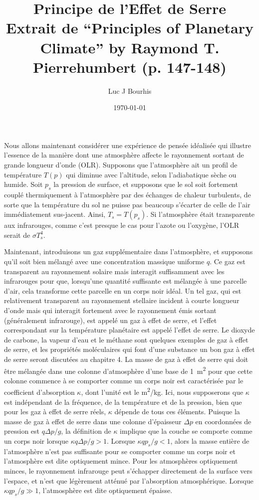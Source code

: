 \documentclass[11pt, a4paper]{article}
\title{\textbf{Principe de l'Effet de Serre\\
Extrait de ``Principles of Planetary Climate'' by Raymond T. Pierrehumbert (p. 147-148)}}
\author{Luc J Bourhis}
\date{\today}                   %
\begin{document}
\maketitle

Nous allons maintenant considérer une expérience de pensée idéalisée qui illustre l'essence de la manière dont une atmosphère affecte le rayonnement sortant de grande longueur d'onde (OLR). Supposons que l'atmosphère ait un profil de température $T(p)$ qui diminue avec l'altitude, selon l'adiabatique sèche ou humide. Soit $p_s$ la pression de surface, et supposons que le sol soit fortement couplé thermiquement à l'atmosphère par des échanges de chaleur turbulents, de sorte que la température du sol ne puisse pas beaucoup s'écarter de celle de l'air immédiatement sus-jacent. Ainsi, $T_s = T(p_s)$. Si l'atmosphère était transparente aux infrarouges, comme c'est presque le cas pour l'azote ou l'oxygène, l'OLR serait de $\sigma T_s^4$.

Maintenant, introduisons un gaz supplémentaire dans l'atmosphère, et supposons qu'il soit bien mélangé avec une concentration massique uniforme $q$. Ce gaz est transparent au rayonnement solaire mais interagit suffisamment avec les infrarouges pour que, lorsqu'une quantité suffisante est mélangée à une parcelle d'air, cela transforme cette parcelle en un corps noir idéal. Un tel gaz, qui est relativement transparent au rayonnement stellaire incident à courte longueur d'onde mais qui interagit fortement avec le rayonnement émis sortant (généralement infrarouge), est appelé un gaz à effet de serre, et l'effet correspondant sur la température planétaire est appelé l'effet de serre. Le dioxyde de carbone, la vapeur d'eau et le méthane sont quelques exemples de gaz à effet de serre, et les propriétés moléculaires qui font d'une substance un bon gaz à effet de serre seront discutées au chapitre 4. La masse de gaz à effet de serre qui doit être mélangée dans une colonne d'atmosphère d'une base de \qty{1}{m^2} pour que cette colonne commence à se comporter comme un corps noir est caractérisée par le coefficient d'absorption $\kappa$, dont l'unité est le \unit{m^2/kg}. Ici, nous supposerons que $\kappa$ est indépendant de la fréquence, de la température et de la pression, bien que pour les gaz à effet de serre réels, $\kappa$ dépende de tous ces éléments. Puisque la masse de gaz à effet de serre dans une colonne d'épaisseur $\Delta p$ en coordonnées de pression est $q \Delta p/g$, la définition de $\kappa$ implique que la couche se comporte comme un corps noir lorsque $\kappa q \Delta p/g > 1$. Lorsque $\kappa q p_s/g < 1$, alors la masse entière de l'atmosphère n'est pas suffisante pour se comporter comme un corps noir et l'atmosphère est dite optiquement mince. Pour les atmosphères optiquement minces, le rayonnement infrarouge peut s'échapper directement de la surface vers l'espace, et n'est que légèrement atténué par l'absorption atmosphérique. Lorsque $\kappa q p_s/g \gg 1$, l'atmosphère est dite optiquement épaisse.
\end{document}
